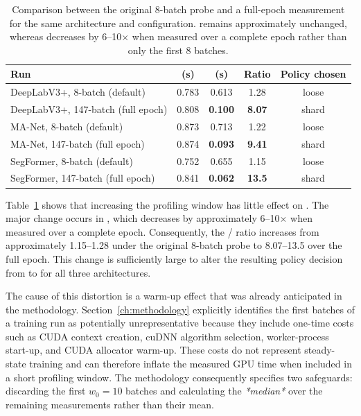 \begin{table}[!ht]
\centering
\begin{tabular}{lcccc}
\toprule
Run & \Tdata{} (s) & \Tgpu{} (s) & Ratio & Policy chosen \\
\midrule
DeepLabV3+, 8-batch (default) & 0.783 & 0.613 & 1.28 & loose \\
DeepLabV3+, 147-batch (full epoch) & 0.808 & \textbf{0.100} & \textbf{8.07} & shard \\
MA-Net, 8-batch (default) & 0.873 & 0.713 & 1.22 & loose \\
MA-Net, 147-batch (full epoch) & 0.874 & \textbf{0.093} & \textbf{9.41} & shard \\
SegFormer, 8-batch (default) & 0.752 & 0.655 & 1.15 & loose \\
SegFormer, 147-batch (full epoch) & 0.841 & \textbf{0.062} & \textbf{13.5} & shard \\
\bottomrule
\end{tabular}
\caption[8-batch probe vs.\ full-epoch measurement]{Comparison between the original 8-batch probe and a full-epoch measurement for the same architecture and configuration. \Tdata{} remains approximately unchanged, whereas \Tgpu{} decreases by 6--10$\times$ when measured over a complete epoch rather than only the first 8 batches.}
\label{tab:profiler-bias-raw}
\end{table}

Table~\ref{tab:profiler-bias-raw} shows that increasing the profiling window has little effect on \Tdata{}. The major change occurs in \Tgpu{}, which decreases by approximately 6--10$\times$ when measured over a complete epoch. Consequently, the \Tdata{}/\Tgpu{} ratio increases from approximately 1.15--1.28 under the original 8-batch probe to 8.07--13.5 over the full epoch. This change is sufficiently large to alter the resulting policy decision from  to  for all three architectures.

The cause of this distortion is a warm-up effect that was already anticipated in the methodology. Section~\ref{ch:methodology} explicitly identifies the first batches of a training run as potentially unrepresentative because they include one-time costs such as CUDA context creation, cuDNN algorithm selection, worker-process start-up, and CUDA allocator warm-up. These costs do not represent steady-state training and can therefore inflate the measured GPU time when included in a short profiling window. The methodology consequently specifies two safeguards: discarding the first $w_0=10$ batches and calculating the \emph{*median*} over the remaining measurements rather than their mean.

